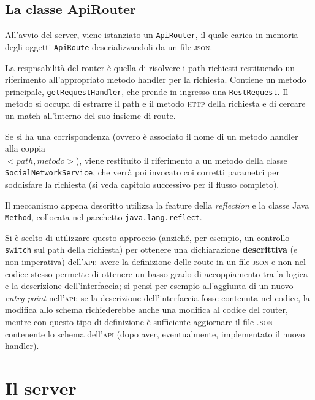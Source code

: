 \documentclass[a4paper,8pt]{article} %
\def\code#1{\texttt{#1}}
\begin{document}
\subsection{La classe ApiRouter}
All'avvio del server, viene istanziato un \code{ApiRouter}, il quale carica in memoria degli oggetti \code{ApiRoute} deserializzandoli da un file \textsc{json}.
\par La respnsabilità del router è quella di risolvere i path richiesti restituendo un riferimento all'appropriato metodo handler per la richiesta.
Contiene un metodo principale, \code{getRequestHandler}, che prende in ingresso una \code{RestRequest}.
Il metodo si occupa di estrarre il path e il metodo \textsc{http} della richiesta e di cercare un match all'interno del suo insieme di route.
\par Se si ha una corrispondenza (ovvero è associato il nome di un metodo handler alla coppia\\ $<path, metodo>$),
viene restituito il riferimento a un metodo della classe \code{SocialNetworkService}, che verrà poi invocato coi corretti parametri per
soddisfare la richiesta (si veda capitolo successivo per il flusso completo).
\par Il meccanismo appena descritto utilizza la feature della \emph{reflection} e la classe Java \href{https://docs.oracle.com/javase/8/docs/api/java/lang/reflect/Method.html}{\code{Method}},
collocata nel pacchetto \code{java.lang.reflect}.
\par Si è scelto di utilizzare questo approccio (anziché, per esempio, un controllo \code{switch} sul path della richiesta) per ottenere una dichiarazione \textbf{descrittiva} (e non imperativa) dell'\textsc{api}:
avere la definizione delle route in un file \textsc{json} e non nel codice stesso permette di ottenere un basso grado di accoppiamento tra la logica e la descrizione dell'interfaccia; si pensi per
esempio all'aggiunta di un nuovo \emph{entry point} nell'\textsc{api}: se la descrizione dell'interfaccia fosse contenuta nel codice, la modifica allo schema richiederebbe anche una modifica al codice del router,
mentre con questo tipo di definizione è sufficiente aggiornare il file \textsc{json} contenente lo schema dell'\textsc{api} (dopo aver, eventualmente, implementato il nuovo handler).



\section{Il server}
\end{document}
